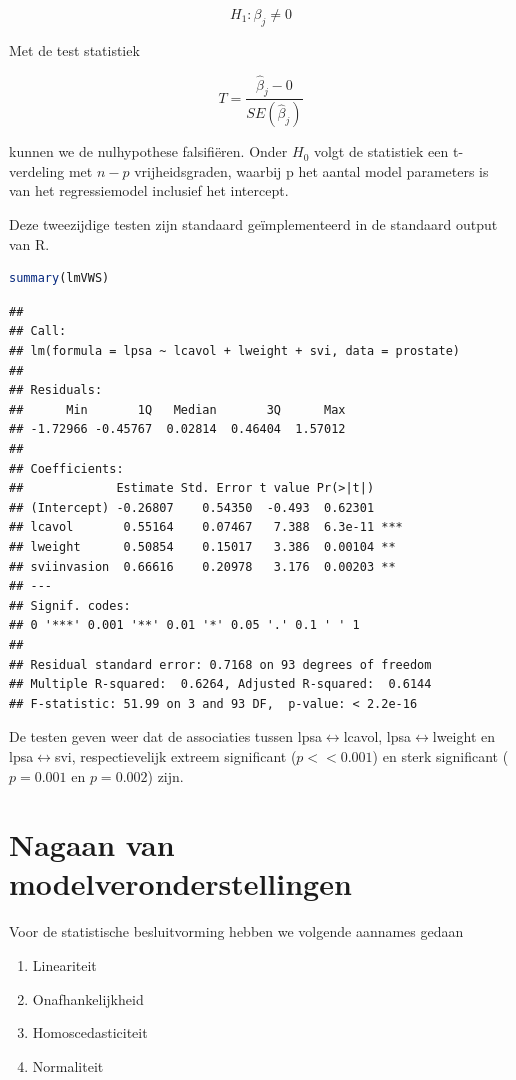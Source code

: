 \documentclass[
  12pt,dutch,coursenotes]{book}
\providecommand{\tightlist}{%
  \setlength{\itemsep}{0pt}\setlength{\parskip}{0pt}}
\begin{document}
\[H_1: \beta_j\neq0\]

Met de test statistiek

\[T=\frac{\hat{\beta}_j-0}{SE(\hat{\beta}_j)}\]

kunnen we de nulhypothese falsifiëren. Onder \(H_0\) volgt de statistiek een t-verdeling met \(n-p\) vrijheidsgraden, waarbij p het aantal model parameters is van het regressiemodel inclusief het intercept.

Deze tweezijdige testen zijn standaard geïmplementeerd in de standaard output van R.

\begin{lstlisting}[language=R]
summary(lmVWS)
\end{lstlisting}

\begin{lstlisting}
## 
## Call:
## lm(formula = lpsa ~ lcavol + lweight + svi, data = prostate)
## 
## Residuals:
##      Min       1Q   Median       3Q      Max 
## -1.72966 -0.45767  0.02814  0.46404  1.57012 
## 
## Coefficients:
##             Estimate Std. Error t value Pr(>|t|)    
## (Intercept) -0.26807    0.54350  -0.493  0.62301    
## lcavol       0.55164    0.07467   7.388  6.3e-11 ***
## lweight      0.50854    0.15017   3.386  0.00104 ** 
## sviinvasion  0.66616    0.20978   3.176  0.00203 ** 
## ---
## Signif. codes:  
## 0 '***' 0.001 '**' 0.01 '*' 0.05 '.' 0.1 ' ' 1
## 
## Residual standard error: 0.7168 on 93 degrees of freedom
## Multiple R-squared:  0.6264, Adjusted R-squared:  0.6144 
## F-statistic: 51.99 on 3 and 93 DF,  p-value: < 2.2e-16
\end{lstlisting}

De testen geven weer dat de associaties tussen lpsa\(\leftrightarrow\)lcavol, lpsa\(\leftrightarrow\)lweight en lpsa\(\leftrightarrow\)svi, respectievelijk extreem significant (\(p << 0.001\)) en sterk significant (\(p=0.001\) en \(p=0.002\)) zijn.

\hypertarget{nagaan-van-modelveronderstellingen-1}{%
\section{Nagaan van modelveronderstellingen}\label{nagaan-van-modelveronderstellingen-1}}

Voor de statistische besluitvorming hebben we volgende aannames gedaan

\begin{enumerate}
\def\labelenumi{\arabic{enumi}.}
\tightlist
\item
  Lineariteit
\item
  Onafhankelijkheid\\
\item
  Homoscedasticiteit
\item
  Normaliteit
\end{enumerate}
\end{document}
